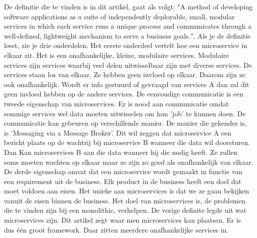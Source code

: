 De definitie die te vinden is in dit artikel, gaat als volgt: "A method of developing software applications as a suite of independently deployable, small, modular services in which each service runs a unique process and communicates through a well-defined, lightweight mechanism to serve a business goals.". Als je de definitie leest, zie je drie onderdelen. Het eerste onderdeel vertelt hoe een microservice in elkaar zit. Het is een onafhankelijke, kleine, modulaire services. Modulaire services zijn services waarbij veel delen uitwisselbaar zijn met diverse services. De services staan los van elkaar. Ze hebben geen invloed op elkaar. Daarom zijn ze ook onafhankelijk. Wordt er info gestuurd of gevraagd van services A dan zal dit geen invloed hebben op de andere services. De eenvoudige communicatie is een tweede eigenschap van microservices. Er is nood aan communicatie omdat sommige services wel data moeten uitwisselen om hun 'job' te kunnen doen. De communicatie kan gebeuren op verschillende manier. De manier die gekender is, is 'Messaging via a Message Broker'. Dit wil zeggen dat microservice A een bericht plaats op de wachtrij bij microservice B wanneer die data wil doorsturen. Dan Kan microservices B aan die data wanneer hij die nodig heeft. Ze zullen soms moeten wachten op elkaar maar ze zijn zo goed als onafhankelijk van elkaar. De derde eigenschap omvat dat een microservice wordt gemaakt in functie van een requirement uit de business. Elk product in de business heeft een doel dat moet voldoen aan eisen. Het unieke aan microservices is dat we ze gaan bekijken vanuit de eisen binnen de business. Het doel van microservices is, de problemen die te vinden zijn bij een monolithic, verhelpen. De vorige definite legde uit wat microservices zijn. Dit artikel zegt waar men microservices kan plaatsen. Er is dus één groot framework. Daar zitten meerdere onafhankelijke services in.

